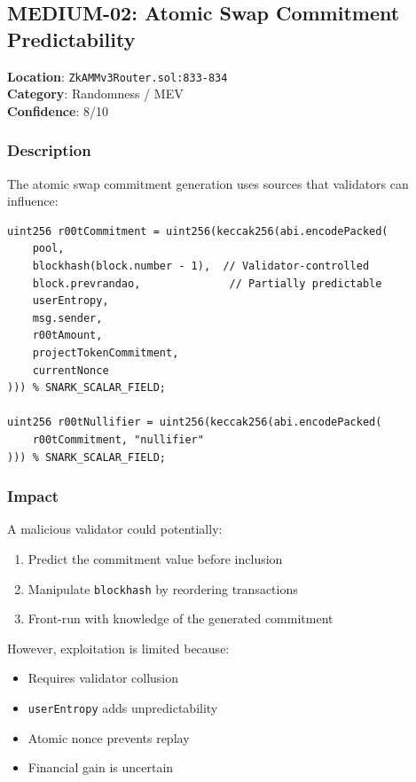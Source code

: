 \documentclass[12pt,a4paper]{article}
\begin{document}
\subsection{MEDIUM-02: Atomic Swap Commitment Predictability}

\begin{tcolorbox}[colback=orange!10, colframe=orange!80!black, title=Medium Severity]
\textbf{Location}: \texttt{ZkAMMv3Router.sol:833-834}\\
\textbf{Category}: Randomness / MEV\\
\textbf{Confidence}: 8/10
\end{tcolorbox}

\subsubsection{Description}

The atomic swap commitment generation uses sources that validators can influence:

\begin{lstlisting}[language=Solidity]
uint256 r00tCommitment = uint256(keccak256(abi.encodePacked(
    pool,
    blockhash(block.number - 1),  // Validator-controlled
    block.prevrandao,              // Partially predictable
    userEntropy,
    msg.sender,
    r00tAmount,
    projectTokenCommitment,
    currentNonce
))) % SNARK_SCALAR_FIELD;

uint256 r00tNullifier = uint256(keccak256(abi.encodePacked(
    r00tCommitment, "nullifier"
))) % SNARK_SCALAR_FIELD;
\end{lstlisting}

\subsubsection{Impact}

A malicious validator could potentially:
\begin{enumerate}
    \item Predict the commitment value before inclusion
    \item Manipulate \texttt{blockhash} by reordering transactions
    \item Front-run with knowledge of the generated commitment
\end{enumerate}

However, exploitation is limited because:
\begin{itemize}
    \item Requires validator collusion
    \item \texttt{userEntropy} adds unpredictability
    \item Atomic nonce prevents replay
    \item Financial gain is uncertain
\end{itemize}
\end{document}
